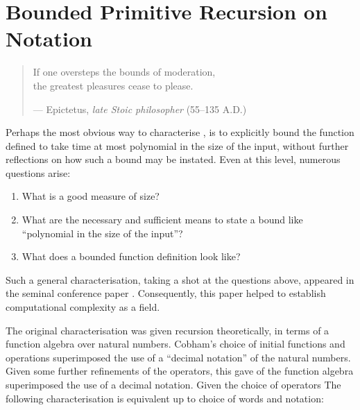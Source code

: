\chapter{Bounded Primitive Recursion on Notation}

\begin{quotation}

\footnotesize\sffamily\itshape

\begin{flushright}

If one oversteps the bounds of moderation, \\
the greatest pleasures cease to please.

\smallbreak

\upshape

--- Epictetus, \emph{late Stoic philosopher} (55--135 A.D.)

\end{flushright}

\end{quotation}

Perhaps the most obvious way to characterise \FPTIME{}, is to explicitly bound
the function defined to take time at most polynomial in the size of the input,
without further reflections on how such a bound may be instated. Even at this
level, numerous questions arise:

\begin{enumerate}[label=(\arabic*)]

\item What is a good measure of size?

\item What are the necessary and sufficient means to state a bound like
``polynomial in the size of the input''?

\item What does a bounded function definition look like?

\end{enumerate}  

Such a general characterisation, taking a shot at the questions above, appeared
in the seminal conference paper \cite{cobham-1965}. Consequently, this paper
helped to establish computational complexity as a field\cite{clote-1999}.

The original characterisation was given recursion theoretically, in terms of a
function algebra over natural numbers. Cobham's choice of initial functions and
operations superimposed the use of a ``decimal notation'' of the natural
numbers. Given some further refinements of the operators, this gave   of the
function algebra superimposed the use of a decimal notation. Given the choice
of operators The following characterisation is equivalent up to choice of words
and notation:

